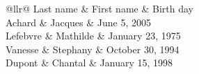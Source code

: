 \documentclass[dvipsnames]{article}
\begin{document}
\medskip
\begin{Code}
\begin{NiceTabular}{@{}llr@{}}
\toprule \RowStyle{\bfseries}
Last name & First name & Birth day \\
\midrule
Achard\emph{}
& Jacques & June 5, 2005 \\
Lefebvre\emph{} 
& Mathilde & January 23, 1975 \\
Vanesse & Stephany & October 30, 1994 \\
Dupont & Chantal & January 15, 1998 \\
\bottomrule
\end{NiceTabular}
\end{Code}
\end{document}

